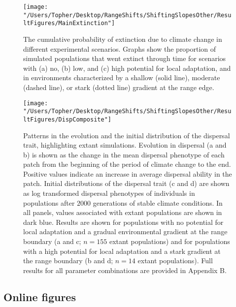 \documentclass[11pt]{article}
\begin{document}
\clearpage

\begin{figure}[h!]
\texttt{[image: "/Users/Topher/Desktop/RangeShifts/ShiftingSlopesOther/ResultFigures/MainExtinction"]}
\caption{The cumulative probability of extinction due to climate change in different experimental scenarios. Graphs show the proportion of simulated populations that went extinct through time for scenarios with (a) no, (b) low, and (c) high potential for local adaptation, and in environments characterized by a shallow (solid line), moderate (dashed line), or stark (dotted line) gradient at the range edge.}
\label{fig:ExtProb}
\end{figure}

\clearpage

\begin{figure}[h!]
\texttt{[image: "/Users/Topher/Desktop/RangeShifts/ShiftingSlopesOther/ResultFigures/DispComposite"]}
\caption{Patterns in the evolution and the initial distribution of the dispersal trait, highlighting extant simulations. Evolution in dispersal (a and b) is shown as the change in the mean dispersal phenotype of each patch from the beginning of the period of climate change to the end. Positive values indicate an increase in average dispersal ability in the patch. Initial distributions of the dispersal trait (c and d) are shown as log transformed dispersal phenotypes of individuals in populations after $2000$ generations of stable climate conditions. In all panels, values associated with extant populations are shown in dark blue. Results are shown for populations with no potential for local adaptation and a gradual environmental gradient at the range boundary (a and c; $n = 155$ extant populations) and for populations with a high potential for local adaptation and a stark gradient at the range boundary (b and d; $n = 14$ extant populations). Full results for all parameter combinations are provided in Appendix B.}
\label{fig:Disp}
\end{figure}

\clearpage

\subsection*{Online figures}

\renewcommand{\thefigure}{A\arabic{figure}}
\setcounter{figure}{0}
\end{document}
